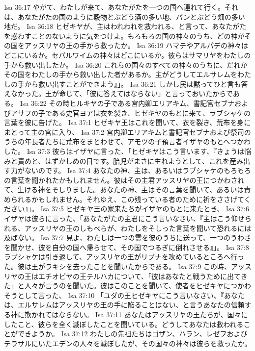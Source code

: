 Isa 36:17  やがて、わたしが来て、あなたがたを一つの国へ連れて行く。それは、あなたがたの国のように穀物とぶどう酒の多い地、パンとぶどう畑の多い地だ。
Isa 36:18  ヒゼキヤが、主はわれわれを救われる、と言って、あなたがたを惑わすことのないように気をつけよ。もろもろの国の神々のうち、どの神がその国をアッスリヤの王の手から救ったか。
Isa 36:19  ハマテやアルパデの神々はどこにいるか。セパルワイムの神々はどこにいるか。彼らはサマリヤをわたしの手から救い出したか。
Isa 36:20  これらの国々のすべての神々のうちに、だれかその国をわたしの手から救い出した者があるか。主がどうしてエルサレムをわたしの手から救い出すことができよう』」。
Isa 36:21  しかし民は黙ってひと言も答えなかった。王が命じて、「彼に答えてはならない」と言っておいたからである。
Isa 36:22  その時ヒルキヤの子である宮内卿エリアキム、書記官セブナおよびアサフの子である史官ヨアは衣を裂き、ヒゼキヤのもとに来て、ラブシャケの言葉を彼に告げた。
Isa 37:1  ヒゼキヤ王はこれを聞いて、衣を裂き、荒布を身にまとって主の宮に入り、
Isa 37:2  宮内卿エリアキムと書記官セブナおよび祭司のうちの年長者たちに荒布をまとわせて、アモツの子預言者イザヤのもとへつかわした。
Isa 37:3  彼らはイザヤに言った、「ヒゼキヤはこう言います、『きょうは悩みと責めと、はずかしめの日です。胎児がまさに生れようとして、これを産み出す力がないのです。
Isa 37:4  あなたの神、主は、あるいはラブシャケのもろもろの言葉を聞かれたかもしれません。彼はその主君アッスリヤの王につかわされて、生ける神をそしりました。あなたの神、主はその言葉を聞いて、あるいは責められるかもしれません。それゆえ、この残っている者のために祈をささげてください』」。
Isa 37:5  ヒゼキヤ王の家来たちがイザヤのもとに来たとき、
Isa 37:6  イザヤは彼らに言った、「あなたがたの主君にこう言いなさい、『主はこう仰せられる、アッスリヤの王のしもべらが、わたしをそしった言葉を聞いて恐れるには及ばない。
Isa 37:7  見よ、わたしは一つの霊を彼のうちに送って、一つのうわさを聞かせ、彼を自分の国へ帰らせて、その国でつるぎに倒れさせる』」。
Isa 37:8  ラブシャケは引き返して、アッスリヤの王がリブナを攻めているところへ行った。彼は王がラキシを去ったことを聞いたからである。
Isa 37:9  この時、アッスリヤの王はエチオピヤの王テルハカについて、「彼はあなたと戦うために出てきた」と人々が言うのを聞いた。彼はこのことを聞いて、使者をヒゼキヤにつかわそうとして言った、
Isa 37:10  「ユダの王ヒゼキヤにこう言いなさい、『あなたは、エルサレムはアッスリヤの王の手に陥ることはない、と言うあなたの信頼する神に欺かれてはならない。
Isa 37:11  あなたはアッスリヤの王たちが、国々にしたこと、彼らを全く滅ぼしたことを聞いている。どうしてあなたは救われることができようか。
Isa 37:12  わたしの先祖たちはゴザン、ハラン、レゼフおよびテラサルにいたエデンの人々を滅ぼしたが、その国々の神々は彼らを救ったか。
